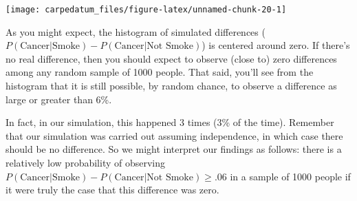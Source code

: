\documentclass[openany]{book}
\newenvironment{Shaded}{\begin{snugshade}}{\end{snugshade}}
\newcommand{\CommentTok}[1]{\textcolor[rgb]{0.56,0.35,0.01}{\textit{#1}}}
\newcommand{\DataTypeTok}[1]{\textcolor[rgb]{0.13,0.29,0.53}{#1}}
\newcommand{\DecValTok}[1]{\textcolor[rgb]{0.00,0.00,0.81}{#1}}
\newcommand{\FloatTok}[1]{\textcolor[rgb]{0.00,0.00,0.81}{#1}}
\newcommand{\KeywordTok}[1]{\textcolor[rgb]{0.13,0.29,0.53}{\textbf{#1}}}
\newcommand{\NormalTok}[1]{#1}
\newcommand{\OperatorTok}[1]{\textcolor[rgb]{0.81,0.36,0.00}{\textbf{#1}}}
\newcommand{\StringTok}[1]{\textcolor[rgb]{0.31,0.60,0.02}{#1}}
\begin{document}
\begin{Shaded}
\end{Shaded}

\begin{center}\texttt{[image: carpedatum\_files/figure-latex/unnamed-chunk-20-1]} \end{center}

As you might expect, the histogram of simulated differences (\(P(\text{Cancer}|\text{Smoke}) - P(\text{Cancer}|\text{Not Smoke})\)) is centered around zero. If there's no real difference, then you should expect to observe (close to) zero differences among any random sample of 1000 people. That said, you'll see from the histogram that it is still possible, by random chance, to observe a difference as large or greater than 6\%.

In fact, in our simulation, this happened 3 times (3\% of the time). Remember that our simulation was carried out assuming independence, in which case there should be no difference. So we might interpret our findings as follows: there is a relatively low probability of observing \(P(\text{Cancer}|\text{Smoke}) - P(\text{Cancer}|\text{Not Smoke})\ge .06\) in a sample of 1000 people if it were truly the case that this difference was zero.
\end{document}
